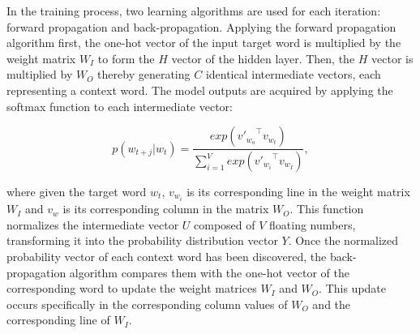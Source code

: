 \documentclass{ieeeaccess}
\begin{document}
In the training process, two learning algorithms are used for each iteration: forward propagation and back-propagation. Applying the forward propagation algorithm first, the one-hot vector of the input target word is multiplied by the weight matrix $ W_ {I} $ to form the $ H $ vector of the hidden layer. Then, the $ H $ vector is  multiplied by $ W_ {O} $ thereby generating $ C $ identical intermediate vectors, each representing a context word. The model outputs are acquired by applying the softmax function to each intermediate vector:


\begin{equation}
    p(w_{t+j}|w_t)=\frac{exp({{v'}_{w_o}}^{\top} v_{w_t})}{\sum_{i=1}^{V}exp({{v'}_{w_i}}^{\top} v_{w_I})},
\end{equation}

\noindent where given the target word $ w_t $, $ v_ {w_i} $ is its corresponding line in the weight matrix $ W_ {I} $ and $ v_ {w} $ is its corresponding column in the matrix $ W_ {O } $. This function normalizes the intermediate vector $ U $ composed of $ V $ floating numbers, transforming it into the probability distribution vector $ Y $. %
Once the normalized probability vector of each context word has been discovered, the back-propagation algorithm compares them with the one-hot vector of the corresponding word to update the weight matrices $ W_ {I} $ and $ W_ { O} $. This update occurs specifically in the corresponding column values of $ W_ {O} $ and the corresponding line of $ W_ {I} $.

\end{document}
